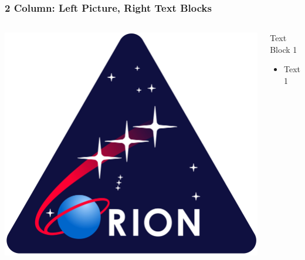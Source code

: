 \begin{frame}\frametitle{2 Column: Left Picture, Right Text Blocks}




  \begin{columns}[t]



  \begin{center}
    \includegraphics[trim=0 0 0 0, clip, width=1.0\textwidth]{Images/Orion_logo.png}
    \vspace{-0.5cm}
    \end{center}



  \begin{block}{Text Block 1}
    \begin{itemize}
      \item Text 1
    \end{itemize}
  \end{block}


\end{columns}
\end{frame}
